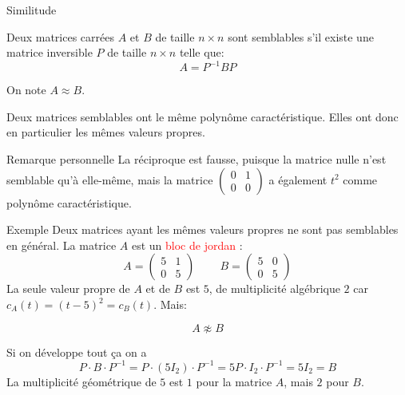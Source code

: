 \begin{parag}{Similitude}
\begin{definition}
    Deux matrices carrées $A$ et $B$ de taille $n \times n$ sont semblables s'il existe une matrice inversible $P$ de taille $n \times n$ telle que:
    \[A = P^{-1}BP\]
    
    On note $A \approx B$.
\end{definition}
\begin{theoreme}
    Deux matrices semblables ont le même polynôme caractéristique. Elles ont donc en particulier les mêmes valeurs propres.
\end{theoreme}
    \begin{subparag}{Remarque personnelle}
        La réciproque est fausse, puisque la matrice nulle n'est semblable qu'à elle-même, mais la matrice $\begin{pmatrix}
            0 & 1 \\ 0 & 0
        \end{pmatrix}$ a également $t^2$ comme polynôme caractéristique.
    \end{subparag}
    \begin{subparag}{Exemple}
        Deux matrices ayant les mêmes valeurs propres ne sont pas semblables en général. La matrice $A$ est un \textcolor{red}{bloc de jordan} :
        \[A = \begin{pmatrix}
            5 &1 \\ 0 & 5
        \end{pmatrix} \; \; \; \;\; \; \; \; B = \begin{pmatrix}
            5 & 0\\ 0 & 5
        \end{pmatrix}\]
        La seule valeur propre de $A$ et de $B$ est $5$, de multiplicité algébrique $2$ car $c_A(t) = (t-5)^2 = c_B(t)$. Mais:
        \begin{formule}
            \[A \not\approx B\]
        \end{formule}
        Si on développe tout ça on a
        \[P\cdot B \cdot P^{-1} = P \cdot (5I_2)\cdot P^{-1} = 5 P \cdot I_2 \cdot P^{-1} = 5I_2 = B\]
        La multiplicité géométrique de $5$ est $1$ pour la matrice $A$, mais $2$ pour $B$.
    \end{subparag}
\end{parag}

